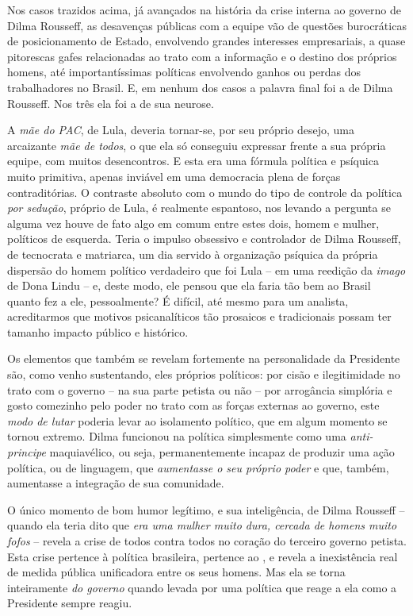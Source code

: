 Nos casos trazidos acima, já avançados na história da crise interna ao
governo de Dilma Rousseff, as desavenças públicas com a equipe vão de
questões burocráticas de posicionamento de Estado, envolvendo grandes
interesses empresariais, a quase pitorescas gafes relacionadas ao trato
com a informação e o destino dos próprios homens, até importantíssimas
políticas envolvendo ganhos ou perdas dos trabalhadores no Brasil. E, em
nenhum dos casos a palavra final foi a de Dilma Rousseff. Nos três ela
foi a de sua neurose.

A \textit{mãe do PAC}, de Lula, deveria tornar-se, por seu próprio desejo, uma arcaizante
\textit{mãe de todos}, o que ela só conseguiu expressar frente a sua própria equipe, com
muitos desencontros. E esta era uma fórmula política e psíquica muito primitiva,
apenas inviável em uma democracia plena de forças contraditórias. O contraste
absoluto com o mundo do tipo de controle da política \textit{por sedução}, próprio de
Lula, é realmente espantoso, nos levando a pergunta se alguma vez houve de fato
algo em comum entre estes dois, homem e mulher, políticos de esquerda. Teria o
impulso obsessivo e controlador de Dilma Rousseff, de tecnocrata e matriarca, um
dia servido à organização psíquica da própria dispersão do homem político
verdadeiro que foi Lula – em uma reedição da \textit{imago} de Dona Lindu – e, deste
modo, ele pensou que ela faria tão bem ao Brasil quanto fez a ele, pessoalmente?
É difícil, até mesmo para um analista, acreditarmos que motivos psicanalíticos
tão prosaicos e tradicionais possam ter tamanho impacto público e histórico.

Os elementos que também se revelam fortemente na personalidade da
Presidente são, como venho sustentando, eles próprios políticos: por
cisão e ilegitimidade no trato com o governo -- na sua parte petista ou
não -- por arrogância simplória e gosto comezinho pelo poder no trato
com as forças externas ao governo, este \emph{modo de lutar} poderia
levar ao isolamento político, que em algum momento se tornou extremo.
Dilma funcionou na política simplesmente como uma \emph{anti-principe}
maquiavélico, ou seja, permanentemente incapaz de produzir uma ação
política, ou de linguagem, que \emph{aumentasse o seu próprio poder} e
que, também, aumentasse a integração de sua comunidade.

O único momento de bom humor legítimo, e sua inteligência, de Dilma
Rousseff -- quando ela teria dito que \emph{era uma mulher muito dura,
cercada de homens muito fofos} -- revela a crise de todos contra todos
no coração do terceiro governo petista. Esta crise pertence à política
brasileira, pertence ao , e revela a inexistência real de medida
pública unificadora entre os seus homens. Mas ela se torna inteiramente
\emph{do governo} quando levada por uma política que reage a ela como a
Presidente sempre reagiu.

